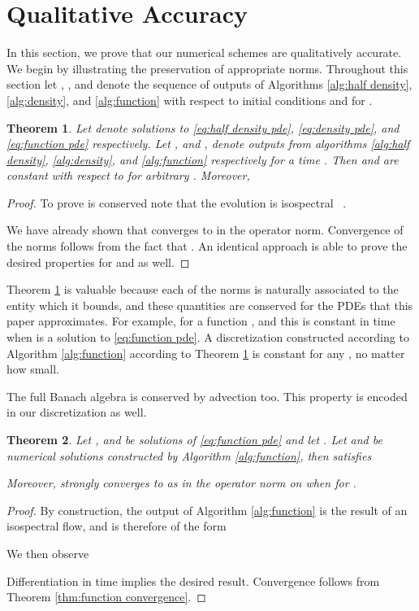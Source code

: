 \documentclass[final,leqno]{amsart}
\newtheorem{theorem}{Theorem}[section]
\begin{document}
\section{Qualitative Accuracy} \label{sec:qualitative}
In this section, we prove that our numerical schemes are qualitatively accurate.
We begin by illustrating the preservation of appropriate norms.
Throughout this section let , , and  denote the sequence of outputs of Algorithms \ref{alg:half density}, \ref{alg:density}, and \ref{alg:function} with respect to initial conditions  and  for .
	
\begin{theorem} \label{thm:norms}
	Let  denote solutions to \eqref{eq:half density pde}, \eqref{eq:density pde}, and \eqref{eq:function pde} respectively.
	Let , and , denote outputs from algorithms \ref{alg:half density}, \ref{alg:density}, and \ref{alg:function} respectively for a time .
	Then  and  are constant with respect to  for arbitrary .
	Moreover,
	
\end{theorem}
\begin{proof}
	To prove  is conserved note that the evolution is isospectral ~\cite{Calvo1997}.

	We have already shown that  converges to  in the operator norm.
	Convergence of the norms follows from the fact that .
	An identical approach is able to prove the desired properties for  and  as well.
\end{proof}

Theorem \ref{thm:norms} is valuable because each of the norms is naturally associated to the entity which it bounds, and these quantities are conserved for the PDEs that this paper approximates.
For example,  for a function , and this is constant in time when  is a solution to \eqref{eq:function pde}.
A discretization constructed according to Algorithm \ref{alg:function} according to Theorem \ref{thm:norms} is constant for any , no matter how small.


The full Banach algebra  is conserved by advection too.
This property is encoded in our discretization as well.
\begin{theorem} \label{thm:algebra}
	Let , and  be solutions of \eqref{eq:function pde} and let .
	Let  and  be numerical solutions constructed by Algorithm \ref{alg:function}, then 
	satisfies
	
	Moreover,  strongly converges to  as  in the operator norm on  when  for .
\end{theorem}
\begin{proof}
	By construction, the output of Algorithm \ref{alg:function} is the result of an isospectral flow, and is therefore of the form 
	
	We then observe
	
	Differentiation in time implies the desired result.
	Convergence follows from Theorem \ref{thm:function convergence}.
\end{proof}
\end{document}
